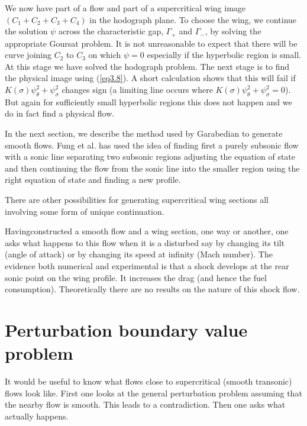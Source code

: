 We now have part of a flow and part of a supercritical wing image $(C_1 + C_2 + C_3 + C_4)$ in the hodograph plane. To choose the wing, we continue the solution $\psi$ across the characteristic gap, $\Gamma_+$ and $\Gamma_-$, by solving the appropriate Goursat problem. It is not unreasonable to expect that there will be curve joining $C_2$ to $C_3$ on which $\psi=0$ especially if the hyperbolic region is small. At this stage we have solved the hodograph problem. The next stage is to find the physical image using (\ref{eq3.8}). A short calculation shows that this will fail if $K(\sigma)\psi^2_\theta + \psi^2_\sigma$ changes sign (a limiting line occurs where $K(\sigma) \psi^2_\theta + \psi^2_\sigma = 0$). But again for sufficiently small hyperbolic regions this does not happen and we do in fact find a physical flow.

In the next section, we describe the method used by Garabedian to generate smooth flows. Fung et al. \cite{key12} has used the idea of finding first a purely subsonic flow with a sonic line separating two subsonic regions adjusting the equation of state and then continuing the flow from the sonic line into the smaller region using the right equation of state and finding a new profile.

There are other possibilities for generating supercritical wing sections all involving some form of unique continuation. 

Having\pageoriginale constructed a smooth flow and a wing section, one way or another, one asks what happens to this flow when it is a disturbed say by changing its tilt (angle of attack) or by changing its speed at infinity (Mach number). The evidence both numerical and experimental is that a shock develops at the rear sonic point on the wing profile. It increases the drag (and hence the fuel consumption). Theoretically there are no results on the nature of this shock flow.

\section{Perturbation boundary value problem}\label{chap3:sec3.10}
It would be useful to know what flows close to supercritical (smooth transonic) flows look like. First one looks at the general perturbation problem assuming that the nearby flow is smooth. This leads to a contradiction. Then one asks what actually happens.

